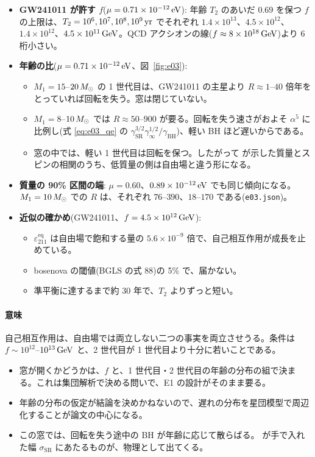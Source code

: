 \begin{result}
\begin{itemize}
\item \textbf{GW241011 が許す $f$}($\mu=0.71\times10^{-12}\,\mathrm{eV}$): 年齢 $T_2$ のあいだ 0.69 を保つ $f$ の上限は、$T_2=10^6,10^7,10^8,10^9\,\mathrm{yr}$ でそれぞれ $1.4\times10^{13}$、$4.5\times10^{12}$、$1.4\times10^{12}$、$4.5\times10^{11}\,\mathrm{GeV}$。QCD アクシオンの線($f\approx8\times10^{18}\,\mathrm{GeV}$)より 6 桁小さい。
\item \textbf{年齢の比}($\mu=0.71\times10^{-12}\,\mathrm{eV}$、図~\ref{fig:e03}):
  \begin{itemize}
  \item $M_1=15$--$20\,M_\odot$ の 1 世代目は、GW241011 の主星より $R\approx1$--$40$ 倍年をとっていれば回転を失う。窓は閉じていない。
  \item $M_1=8$--$10\,M_\odot$ では $R\approx50$--$900$ が要る。回転を失う速さがおよそ $\alpha^5$ に比例し(式 \eqref{eq:e03_qe} の $\gamma_\mathrm{SR}^{3/2}\gamma_\infty^{1/2}/\gamma_\mathrm{BH}$)、軽い BH ほど遅いからである。
  \item 窓の中では、軽い 1 世代目は回転を保つ。したがって  が示した質量とスピンの相関のうち、低質量の側は自由場と違う形になる。
  \end{itemize}
\item \textbf{質量の 90\% 区間の端}: $\mu=0.60$、$0.89\times10^{-12}\,\mathrm{eV}$ でも同じ傾向になる。$M_1=10\,M_\odot$ での $R$ は、それぞれ $76$--$390$、$18$--$170$ である(\texttt{e03.json})。
\item \textbf{近似の確かめ}(GW241011、$f=4.5\times10^{12}\,\mathrm{GeV}$):
  \begin{itemize}
  \item $\varepsilon_{211}^\mathrm{eq}$ は自由場で飽和する量の $5.6\times10^{-9}$ 倍で、自己相互作用が成長を止めている。
  \item bosenova の閾値(BGLS の式 88)の 5\% で、届かない。
  \item 準平衡に達するまで約 30 年で、$T_2$ よりずっと短い。
  \end{itemize}
\end{itemize}
\end{result}

\paragraph{意味}
自己相互作用は、自由場では両立しない二つの事実を両立させうる。条件は $f\sim10^{12}$--$10^{13}\,\mathrm{GeV}$ と、2 世代目が 1 世代目より十分に若いことである。
\begin{itemize}
\item 窓が開くかどうかは、$f$ と、1 世代目・2 世代目の年齢の分布の組で決まる。これは集団解析で決める問いで、E1 の設計がそのまま要る。
\item 年齢の分布の仮定が結論を決めかねないので、遅れの分布を星団模型で周辺化することが論文の中心になる。
\item この窓では、回転を失う途中の BH が年齢に応じて散らばる。 が手で入れた幅 $\sigma_\mathrm{SR}$ にあたるものが、物理として出てくる。
\end{itemize}

